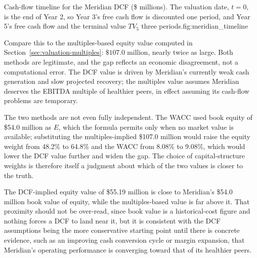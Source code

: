 \documentclass[../ai_in_finance]{subfiles}
\begin{document}
\begin{bookfigure}{Cash-flow timeline for the Meridian DCF (\$ millions). The valuation date, $t=0$, is the end of Year 2, so Year 3's free cash flow is discounted one period, and Year 5's free cash flow and the terminal value $TV_5$ three periods.}{fig:meridian_timeline}
\end{bookfigure}

Compare this to the multiples-based equity value computed in Section~\ref{sec:valuation-multiples}: $\$107.0$ million, nearly twice as large. Both methods are legitimate, and the gap reflects an economic disagreement, not a computational error. The DCF value is driven by Meridian's currently weak cash generation and slow projected recovery; the multiples value assumes Meridian deserves the EBITDA multiple of healthier peers, in effect assuming its cash-flow problems are temporary.

The two methods are not even fully independent. The WACC used book equity of \$54.0 million as $E$, which the formula permits only when no market value is available; substituting the multiples-implied \$107.0 million would raise the equity weight from 48.2\% to 64.8\% and the WACC from 8.08\% to 9.08\%, which would lower the DCF value further and widen the gap. The choice of capital-structure weights is therefore itself a judgment about which of the two values is closer to the truth.

The DCF-implied equity value of \$55.19 million is close to Meridian's \$54.0 million book value of equity, while the multiples-based value is far above it. That proximity should not be over-read, since book value is a historical-cost figure and nothing forces a DCF to land near it, but it is consistent with the DCF assumptions being the more conservative starting point until there is concrete evidence, such as an improving cash conversion cycle or margin expansion, that Meridian's operating performance is converging toward that of its healthier peers.
\end{document}
